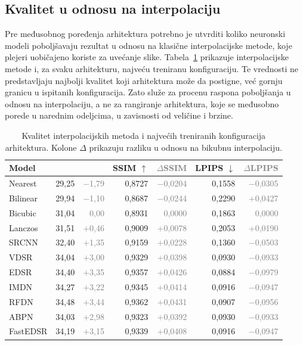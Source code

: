 \documentclass[12pt,a4paper]{article}
\begin{document}
\subsection{Kvalitet u odnosu na interpolaciju}

Pre međusobnog poređenja arhitektura potrebno je utvrditi koliko neuronski modeli poboljšavaju rezultat u odnosu na klasične interpolacijske metode, koje plejeri uobičajeno koriste za uvećanje slike. Tabela~\ref{tab:results_best_models} prikazuje interpolacijske metode i, za svaku arhitekturu, najveću treniranu konfiguraciju. Te vrednosti ne predstavljaju najbolji kvalitet koji arhitektura može da postigne, već gornju granicu u ispitanih konfiguracija. Zato služe za procenu raspona poboljšanja u odnosu na interpolaciju, a ne za rangiranje arhitektura, koje se međusobno porede u narednim odeljcima, u zavisnosti od veličine i brzine.

\begin{table}[H]
	\centering
	\begingroup
	\small
	\setlength{\tabcolsep}{3.5pt}
	\renewcommand{\arraystretch}{1.15}
	\newcommand*{\dlt}[1]{\textcolor{gray}{#1}}
	\begin{tabular}{@{}lrrrrrr@{}}
		\toprule
		Model & \shortstack{PSNR $\uparrow$} & \dlt{\shortstack{$\Delta$PSNR}} & \qquad SSIM $\uparrow$ & \dlt{$\Delta$SSIM} & \qquad LPIPS $\downarrow$ & \dlt{$\Delta$LPIPS} \\
		\midrule
		Nearest & 29,25 & \dlt{$-$1,79} & 0,8727 & \dlt{$-$0,0204} & 0,1558 & \dlt{$-$0,0305} \\
		Bilinear & 29,94 & \dlt{$-$1,10} & 0,8687 & \dlt{$-$0,0244} & 0,2290 & \dlt{$+$0,0427} \\
		Bicubic & 31,04 & \dlt{0,00} & 0,8931 & \dlt{0,0000} & 0,1863 & \dlt{0,0000} \\
		Lanczos & 31,51 & \dlt{$+$0,46} & 0,9009 & \dlt{$+$0,0078} & 0,2053 & \dlt{$+$0,0190} \\
		\midrule
		SRCNN & 32,40 & \dlt{$+$1,35} & 0,9159 & \dlt{$+$0,0228} & 0,1360 & \dlt{$-$0,0503} \\
		VDSR & 34,04 & \dlt{$+$3,00} & 0,9329 & \dlt{$+$0,0398} & 0,0930 & \dlt{$-$0,0933} \\
		EDSR & 34,40 & \dlt{$+$3,35} & 0,9357 & \dlt{$+$0,0426} & 0,0884 & \dlt{$-$0,0979} \\
		IMDN & 34,27 & \dlt{$+$3,22} & 0,9345 & \dlt{$+$0,0414} & 0,0916 & \dlt{$-$0,0947} \\
		RFDN & 34,48 & \dlt{$+$3,44} & 0,9362 & \dlt{$+$0,0431} & 0,0907 & \dlt{$-$0,0956} \\
		ABPN & 34,03 & \dlt{$+$2,98} & 0,9323 & \dlt{$+$0,0392} & 0,0930 & \dlt{$-$0,0933} \\
		FastEDSR & 34,19 & \dlt{$+$3,15} & 0,9339 & \dlt{$+$0,0408} & 0,0916 & \dlt{$-$0,0947} \\
		\bottomrule
	\end{tabular}
	\endgroup
	\caption{Kvalitet interpolacijskih metoda i najvećih treniranih konfiguracija arhitektura. Kolone $\Delta$ prikazuju razliku u odnosu na bikubnu interpolaciju.}
	\label{tab:results_best_models}
\end{table}
\end{document}
